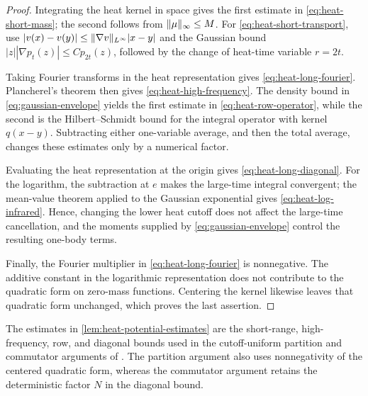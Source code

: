 \documentclass[11pt,reqno]{amsart}
\numberwithin{equation}{section}
\theoremstyle{plain}
\theoremstyle{remark}
\DeclarePairedDelimiter{\norm}{\lVert}{\rVert}
\begin{document}
\begin{proof}
Integrating the heat kernel in space gives the first estimate in \eqref{eq:heat-short-mass}; the second follows from $\norm\mu_\infty\le M$. For \eqref{eq:heat-short-transport}, use $|v(x)-v(y)|\le\norm{\nabla v}_{L^\infty}|x-y|$ and the Gaussian bound
$|z||\nabla p_t(z)|\le Cp_{2t}(z)$, followed by the change of heat-time variable $r=2t$.

Taking Fourier transforms in the heat representation gives \eqref{eq:heat-long-fourier}. Plancherel's theorem then gives \eqref{eq:heat-high-frequency}. The density bound in \eqref{eq:gaussian-envelope} yields the first estimate in \eqref{eq:heat-row-operator}, while the second is the Hilbert--Schmidt bound for the integral operator with kernel $q(x-y)$. Subtracting either one-variable average, and then the total average, changes these estimates only by a numerical factor.

Evaluating the heat representation at the origin gives \eqref{eq:heat-long-diagonal}. For the logarithm, the subtraction at $e$ makes the large-time integral convergent; the mean-value theorem applied to the Gaussian exponential gives \eqref{eq:heat-log-infrared}. Hence, changing the lower heat cutoff does not affect the large-time cancellation, and the moments supplied by \eqref{eq:gaussian-envelope} control the resulting one-body terms.

Finally, the Fourier multiplier in \eqref{eq:heat-long-fourier} is nonnegative. The additive constant in the logarithmic representation does not contribute to the quadratic form on zero-mass functions. Centering the kernel likewise leaves that quadratic form unchanged, which proves the last assertion.
\end{proof}

The estimates in \cref{lem:heat-potential-estimates} are the short-range, high-frequency, row, and diagonal bounds used in the cutoff-uniform partition and commutator arguments of \cite[Sections~4, 5.1, and~7]{DGRpartition}. The partition argument also uses nonnegativity of the centered quadratic form, whereas the commutator argument retains the deterministic factor $N$ in the diagonal bound.
\end{document}
